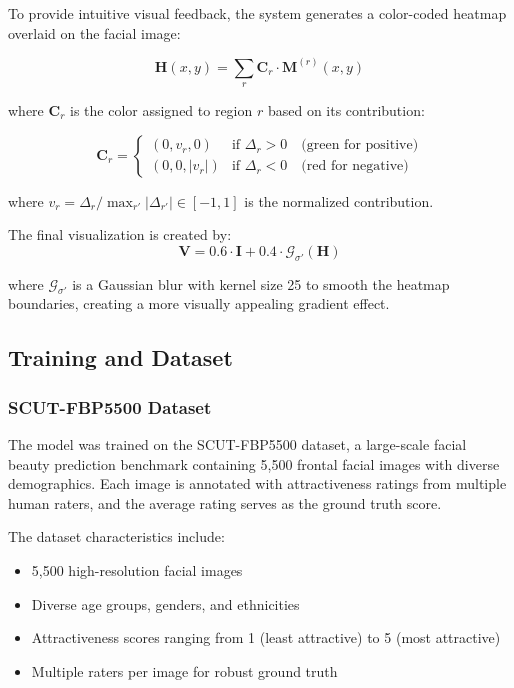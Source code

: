 To provide intuitive visual feedback, the system generates a color-coded heatmap overlaid on the facial image:

\begin{equation}
\mathbf{H}(x, y) = \sum_{r} \mathbf{C}_r \cdot \mathbf{M}^{(r)}(x, y)
\end{equation}

where $\mathbf{C}_r$ is the color assigned to region $r$ based on its contribution:

\begin{equation}
\mathbf{C}_r = \begin{cases}
(0, v_r, 0) & \text{if } \Delta_r > 0 \quad \text{(green for positive)} \\
(0, 0, |v_r|) & \text{if } \Delta_r < 0 \quad \text{(red for negative)}
\end{cases}
\end{equation}

where $v_r = \Delta_r / \max_{r'} |\Delta_{r'}| \in [-1, 1]$ is the normalized contribution.

The final visualization is created by:
\begin{equation}
\mathbf{V} = 0.6 \cdot \mathbf{I} + 0.4 \cdot \mathcal{G}_{\sigma'}(\mathbf{H})
\end{equation}

where $\mathcal{G}_{\sigma'}$ is a Gaussian blur with kernel size 25 to smooth the heatmap boundaries, creating a more visually appealing gradient effect.

\subsection{Training and Dataset}

\subsubsection{SCUT-FBP5500 Dataset}

The model was trained on the SCUT-FBP5500 dataset, a large-scale facial beauty prediction benchmark containing 5,500 frontal facial images with diverse demographics. Each image is annotated with attractiveness ratings from multiple human raters, and the average rating serves as the ground truth score.

The dataset characteristics include:
\begin{itemize}
    \item 5,500 high-resolution facial images
    \item Diverse age groups, genders, and ethnicities
    \item Attractiveness scores ranging from 1 (least attractive) to 5 (most attractive)
    \item Multiple raters per image for robust ground truth
\end{itemize}


